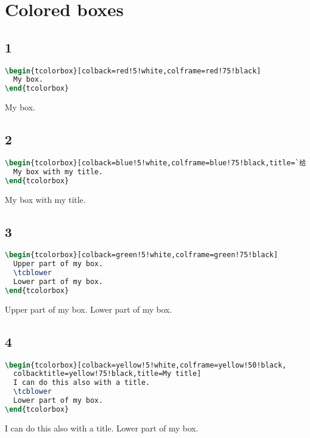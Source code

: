 \documentclass{ctexart}
\begin{document}
\section{Colored boxes}

\subsection{1}
\begin{lstlisting}[language={TeX}]
\begin{tcolorbox}[colback=red!5!white,colframe=red!75!black]
  My box.
\end{tcolorbox}
\end{lstlisting}
\begin{tcolorbox}[colback=red!5!white,colframe=red!75!black]
  My box.
\end{tcolorbox}


\subsection{2}
\begin{lstlisting}[language={TeX}]
\begin{tcolorbox}[colback=blue!5!white,colframe=blue!75!black,title=`给框加标题`]
  My box with my title.
\end{tcolorbox}
\end{lstlisting}
\begin{tcolorbox}[colback=blue!5!white,colframe=blue!75!black,title=`给框加标题`]
  My box with my title.
\end{tcolorbox}

\subsection{3}
\begin{lstlisting}[language={TeX}]
\begin{tcolorbox}[colback=green!5!white,colframe=green!75!black]
  Upper part of my box.
  \tcblower
  Lower part of my box.
\end{tcolorbox}
\end{lstlisting}
\begin{tcolorbox}[colback=green!5!white,colframe=green!75!black]
  Upper part of my box.
  \tcblower
  Lower part of my box.
\end{tcolorbox}

\subsection{4}
\begin{lstlisting}[language={TeX}]
\begin{tcolorbox}[colback=yellow!5!white,colframe=yellow!50!black,
  colbacktitle=yellow!75!black,title=My title]
  I can do this also with a title.
  \tcblower
  Lower part of my box.
\end{tcolorbox}
\end{lstlisting}
\begin{tcolorbox}[colback=yellow!5!white,colframe=yellow!50!black,
  colbacktitle=yellow!75!black,title=My title]
  I can do this also with a title.
  \tcblower
  Lower part of my box.
\end{tcolorbox}
\end{document}
